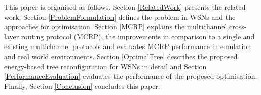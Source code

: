 
This paper is organised as follows. Section \ref{RelatedWork} presents the related work, Section \ref{ProblemFormulation} defines the problem in WSNs and the approaches for optimisation. Section \ref{MCRP} explains the multichannel cross-layer routing protocol (MCRP), the improvements in comparison to a single and existing multichannel protocols and evaluates MCRP performance in emulation and real world environments.
Section \ref{OptimalTree} describes the proposed energy-based tree reconfiguration for WSNs in detail and Section \ref{PerformanceEvaluation} evaluates the performance of the proposed optimisation. Finally, Section \ref{Conclusion} concludes this paper.